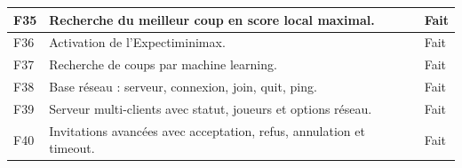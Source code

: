 \documentclass[a4paper]{article}
\begin{document}
\begin{longtable}{|p{1.3cm}|p{11.4cm}|p{1.8cm}|}
    \hline
    F35 & Recherche du meilleur coup en score local maximal. & Fait \\
    \hline
    F36 & Activation de l'Expectiminimax. & Fait \\
    \hline
    F37 & Recherche de coups par machine learning. & Fait \\
    \hline
    F38 & Base réseau : serveur, connexion, join, quit, ping. & Fait \\
    \hline
    F39 & Serveur multi-clients avec statut, joueurs et options réseau. & Fait \\
    \hline
    F40 & Invitations avancées avec acceptation, refus, annulation et timeout. & Fait \\
    \hline
\end{longtable}
\end{document}
